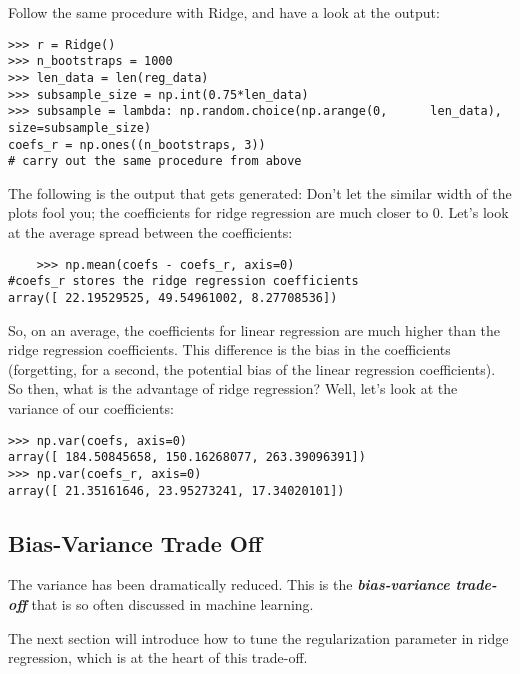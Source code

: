\documentclass[SKL-MASTER.tex]{subfiles}
\begin{document}
Follow the same procedure with Ridge, and have a look at the output:
\begin{framed}
\begin{verbatim}
>>> r = Ridge()
>>> n_bootstraps = 1000
>>> len_data = len(reg_data)
>>> subsample_size = np.int(0.75*len_data)
>>> subsample = lambda: np.random.choice(np.arange(0,      len_data),
size=subsample_size)
coefs_r = np.ones((n_bootstraps, 3))
# carry out the same procedure from above
\end{verbatim}
\end{framed}
The following is the output that gets generated:
Don't let the similar width of the plots fool you; the coefficients for ridge regression are much
closer to 0. Let's look at the average spread between the coefficients:
\begin{framed}
	\begin{verbatim}
	>>> np.mean(coefs - coefs_r, axis=0)
#coefs_r stores the ridge regression coefficients
array([ 22.19529525, 49.54961002, 8.27708536])
\end{verbatim}
\end{framed}
So, on an average, the coefficients for linear regression are much higher than the ridge
regression coefficients. This difference is the bias in the coefficients (forgetting, for a second,
the potential bias of the linear regression coefficients). So then, what is the advantage of ridge
regression? Well, let's look at the variance of our coefficients:
\begin{framed}
	\begin{verbatim}
>>> np.var(coefs, axis=0)
array([ 184.50845658, 150.16268077, 263.39096391])
>>> np.var(coefs_r, axis=0)
array([ 21.35161646, 23.95273241, 17.34020101])
\end{verbatim}
\end{framed}

\subsection*{Bias-Variance Trade Off}
The variance has been dramatically reduced. This is the \textbf{\textit{bias-variance trade-off}} that is
so often discussed in machine learning. 


The next section will introduce how to tune the
regularization parameter in ridge regression, which is at the heart of this trade-off.
\end{document}
